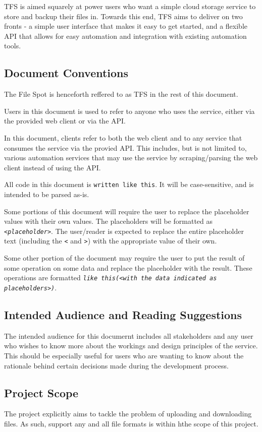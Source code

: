 \documentclass[12pt,a4paper]{report}
\begin{document}
TFS is aimed squarely at power users who want a simple cloud storage service to store and backup their files in. Towards this end, TFS aims to deliver on two fronts - a simple user interface that makes it easy to get started, and a flexible API that allows for easy automation and integration with existing automation tools.
\subsection{Document Conventions}
The File Spot is henceforth reffered to as TFS in the rest of this document.

Users in this document is used to refer to anyone who uses the service, either via the provided web client or via the API.

In this document, clients refer to both the web client and to any service that consumes the service via the provied API. This includes, but is not limited to, various automation services that may use the service by scraping/parsing the web client instead of using the API.

All code in this document is \texttt{written like this}. It will be case-sensitive, and is intended to be parsed as-is.

Some portions of this document will require the user to replace the placeholder values with their own values.
The placeholders will be formatted as \texttt{\textsl{<placeholder>}}.
The user/reader is expected to replace the entire placeholder text (including the \texttt{<} and \texttt{>}) with the appropriate value of their own.

Some other portion of the document may require the user to put the result of some operation on some data and replace the placeholder with the result.
These operations are formatted \texttt{\textit{like this(}\textsl{<with the data indicated as placeholders>}\textit{)}}.
\subsection{Intended Audience and Reading Suggestions}
The intended audience for this documernt includes all stakeholders and any user who wishes to know more about the workings and design principles of the service. This should be especially useful for users who are wanting to know about the rationale behind certain decisions made during the development process.
\subsection{Project Scope}
The project explicitly aims to tackle the problem of uploading and downloading files. As such, support any and all file formats is within hthe scope of this project.
\end{document}
